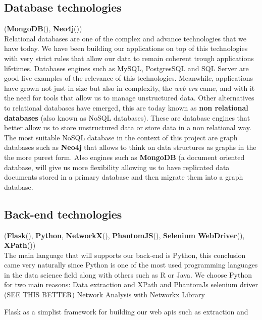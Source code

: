 \subsection{Database technologies}
(\textbf{MongoDB}(\cite{mongodb}), \textbf{Neo4j}(\cite{developers2012neo4j}))\\

Relational databases are one of the complex and advance technologies that we have today. We have been building our applications on top of this technologies with very strict rules that allow our data to remain coherent trough applications lifetimes. Databases engines such as MySQL, PostgresSQL and SQL Server are good live examples of the relevance of this technologies. Meanwhile, applications have grown not just in size but also in complexity, the \textit{web era} came, and with it the need for tools that allow us to manage unstructured data. Other alternatives to relational databases have emerged, this are today known as \textbf{non relational databases} (also known as NoSQL databases). These are database engines that better allow us to store unstructured data or store data in a non relational way. The most suitable NoSQL database in the context of this project are graph databases such as \textbf{Neo4j} that allows to think on data structures as graphs in the the more purest form. Also engines such as \textbf{MongoDB} (a document oriented database, will give us more flexibility allowing us to have replicated data documents stored in a primary database and then migrate them into a graph database.

\subsection{Back-end technologies}
(\textbf{Flask}(\cite{ronacher2015flask}), \textbf{Python}, \textbf{NetworkX}(\cite{hagberg2013networkx}), \textbf{PhantomJS}(\cite{hidayat2013phantomjs}), \textbf{Selenium WebDriver}(\cite{documentation2013selenium}), \textbf{XPath}(\cite{clark1999xml}))\\

The main language that will supports our back-end is Python, this conclusion came very naturally since Python is one of the most used programming languages in the data
science field along with others such as R or Java. We choose Python for two main reasons:
Data extraction and XPath and PhantomJs selenium driver (SEE THIS BETTER)
Network Analysis with Networkx Library

Flask as a simplist framework for building our web \glspl{api} such as extraction and

